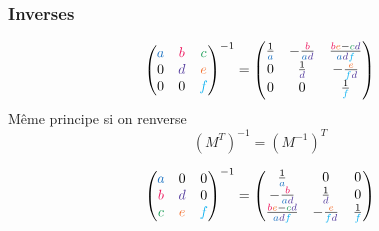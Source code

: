 \documentclass[]{article}
\begin{document}
\begin{multicols}{3}
\subsubsection{Inverses}
$$\begin{pmatrix}
\textcolor{RoyalBlue}{a} & \textcolor{OrangeRed}{b} & \textcolor{ForestGreen}{c}\\
0 & \textcolor{Violet}{d} & \textcolor{Orange}{e}\\
0 & 0 & \textcolor{ProcessBlue}{f}
\end{pmatrix}^{-1}=\begin{pmatrix}
\frac{1}{\textcolor{RoyalBlue}{a}} & -\frac{\textcolor{OrangeRed}{b}}{\textcolor{RoyalBlue}{a}\textcolor{Violet}{d}} & \frac{\textcolor{OrangeRed}{b}\textcolor{Orange}{e}-\textcolor{ForestGreen}{c}\textcolor{Violet}{d}}{\textcolor{RoyalBlue}{a}\textcolor{Violet}{d}\textcolor{ProcessBlue}{f}}\\
0 & \frac{1}{\textcolor{Violet}{d}} & -\frac{\textcolor{Orange}{e}}{\textcolor{ProcessBlue}{f}\textcolor{Violet}{d}}\\
0 & 0 & \frac{1}{\textcolor{ProcessBlue}{f}}
\end{pmatrix}$$
Même principe si on renverse
$$\left(M^{T}\right)^{-1}=\left(M^{-1}\right)^{T}$$

$$\begin{pmatrix}
\textcolor{RoyalBlue}{a} & 0 & 0\\
\textcolor{OrangeRed}{b} & \textcolor{Violet}{d} & 0\\
\textcolor{ForestGreen}{c} & \textcolor{Orange}{e} & \textcolor{ProcessBlue}{f}
\end{pmatrix}^{-1}=\begin{pmatrix}
\frac{1}{\textcolor{RoyalBlue}{a}} & 0 & 0\\
-\frac{\textcolor{OrangeRed}{b}}{\textcolor{RoyalBlue}{a}\textcolor{Violet}{d}} & \frac{1}{\textcolor{Violet}{d}} & 0\\
\frac{\textcolor{OrangeRed}{b}\textcolor{Orange}{e}-\textcolor{ForestGreen}{c}\textcolor{Violet}{d}}{\textcolor{RoyalBlue}{a}\textcolor{Violet}{d}\textcolor{ProcessBlue}{f}} & -\frac{\textcolor{Orange}{e}}{\textcolor{ProcessBlue}{f}\textcolor{Violet}{d}} &
\frac{1}{\textcolor{ProcessBlue}{f}}
\end{pmatrix}$$


\end{multicols}
\end{document}
